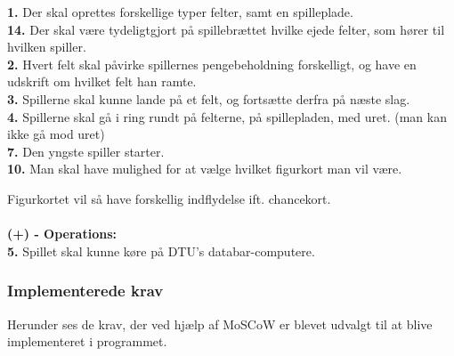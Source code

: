     \textbf{1.} Der skal oprettes forskellige typer felter, samt en spilleplade. 
    \\
    \textbf{14.} Der skal være tydeligtgjort på spillebrættet hvilke ejede felter, som hører til hvilken spiller. 
    \\
    \textbf{2.} Hvert felt skal påvirke spillernes pengebeholdning forskelligt, og have en udskrift om hvilket felt han ramte. 
    \\
    \textbf{3.} Spillerne skal kunne lande på et felt, og fortsætte derfra på næste slag. 
    \\
    \textbf{4.} Spillerne skal gå i ring rundt på felterne, på spillepladen, med uret. (man kan ikke gå mod uret) 
    \\
    \textbf{7.} Den yngste spiller starter. 
    \\
    \textbf{10.} Man skal have mulighed for at vælge hvilket figurkort man vil være.
    
    Figurkortet vil så have forskellig indflydelse ift. chancekort.
\\\\\textbf{(+) - Operations:}\\
    \textbf{5.} Spillet skal kunne køre på DTU’s databar-computere. 
    \\

    \pagebreak
\subsubsection{Implementerede krav}

Herunder ses de krav, der ved hjælp af MoSCoW er blevet udvalgt til at blive implementeret i programmet. 
\\

